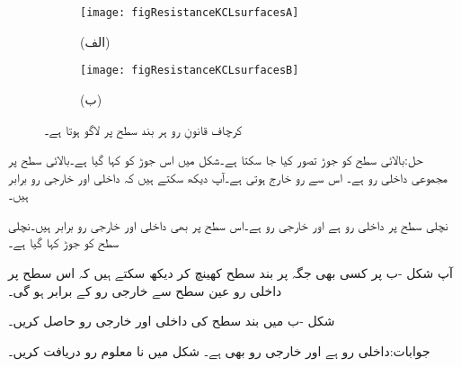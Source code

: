 \begin{figure}
\centering
\begin{subfigure}{0.5\textwidth}
\centering
\texttt{[image: figResistanceKCLsurfacesA]}
\caption*{(الف)}
\end{subfigure}%
%
\begin{subfigure}{0.5\textwidth}
\centering
\texttt{[image: figResistanceKCLsurfacesB]}
\caption*{(ب)}
\end{subfigure}%
\caption{کرچاف قانونِ رو ہر بند سطح پر لاگو ہوتا ہے۔}
\label{شکل_مزاحمتی_بند_سطح_قانون_رو}
\end{figure}

حل:بالائی سطح کو جوڑ تصور کیا جا سکتا ہے۔شکل میں اس جوڑ کو  کہا گیا ہے۔بالائی سطح پر مجموعی داخلی رو
  ہے۔ اس سے  رو خارج ہوتی ہے۔آپ دیکھ سکتے ہیں کہ داخلی اور خارجی رو برابر ہیں۔

نچلی سطح پر داخلی رو  ہے اور خارجی رو  ہے۔اس سطح پر بھی داخلی اور خارجی رو برابر ہیں۔نچلی سطح کو جوڑ  کہا گیا ہے۔ 
\FloatBarrier

آپ شکل -ب پر کسی بھی جگہ پر بند سطح کھینچ کر دیکھ سکتے ہیں کہ اس سطح پر داخلی رو عین سطح سے خارجی رو کے برابر ہو گی۔

شکل -ب میں بند سطح کی داخلی اور خارجی رو حاصل کریں۔

جوابات:داخلی رو  ہے اور خارجی رو بھی  ہے۔
\FloatBarrier
شکل  میں نا معلوم رو دریافت کریں۔    

